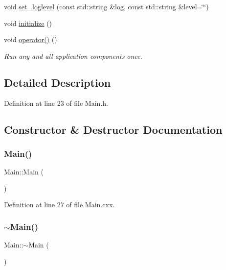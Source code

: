 \begin{DoxyCompactItemize}
void \hyperlink{class_wire_cell_1_1_main_a2b649ad950c80a65798687e79b6bf7bd}{set\+\_\+loglevel} (const std\+::string \&log, const std\+::string \&level=\char`\"{}\char`\"{})
\item 
void \hyperlink{class_wire_cell_1_1_main_a7cd2683098093ad0f714873a9112543e}{initialize} ()
\item 
void \hyperlink{class_wire_cell_1_1_main_a4a7f5c181bfd1cc972156ff96952436a}{operator()} ()
\begin{DoxyCompactList}\small\item\em Run any and all application components once. \end{DoxyCompactList}\end{DoxyCompactItemize}


\subsection{Detailed Description}


Definition at line 23 of file Main.\+h.



\subsection{Constructor \& Destructor Documentation}
\mbox{\label{class_wire_cell_1_1_main_a50d4361a1b613205467a441b5c40c199}} 
\subsubsection{\texorpdfstring{Main()}{Main()}}
{\footnotesize\ttfamily Main\+::\+Main (\begin{DoxyParamCaption}{ }\end{DoxyParamCaption})}



Definition at line 27 of file Main.\+cxx.

\mbox{\label{class_wire_cell_1_1_main_a58d9c0798f0d2114e736d04d780a080f}} 
\subsubsection{\texorpdfstring{$\sim$\+Main()}{~Main()}}
{\footnotesize\ttfamily Main\+::$\sim$\+Main (\begin{DoxyParamCaption}{ }\end{DoxyParamCaption})}



